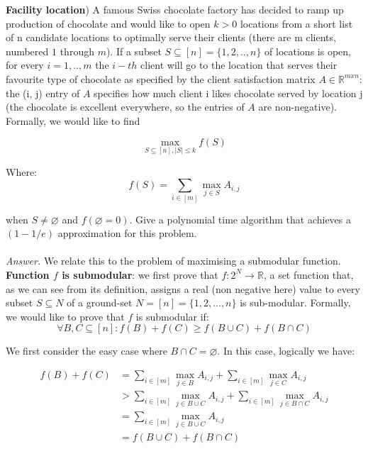 \documentclass[10pt,usenames,dvipsnames]{article}
\newenvironment{exercise}[2][Exercise]{\begin{trivlist}
  \item[\hskip \labelsep {\bfseries #1}\hskip \labelsep {\bfseries #2.}]}{\end{trivlist}}
\begin{document}
 \newpage
\begin{exercise}{4} (\textbf{Facility location}) A famous Swiss chocolate factory has decided to ramp up production of chocolate and would like to open $k>0$ locations from a short list of n candidate locations to optimally serve their clients (there are m clients, numbered $1$ through $m$).  If a
subset $ S \subseteq [n] = \{1,2,..,n\}$ of locations is open, for every $i = 1, ..,m$ the $i-th$ client will go to the location that serves their favourite type of chocolate as specified by the client satisfaction matrix $A \in \mathbb{R}^{mxn}$: the (i, j) entry of $A$ specifies how much client i likes chocolate served by
location j (the chocolate is excellent everywhere, so the entries of $A$ are non-negative). Formally,
we would like to find 

\begin{equation*}
    \max\limits_{S\subseteq[n], |S|\leq k} f(S) 
\end{equation*}

Where:
\begin{equation}
    f(S) = \sum_{i\in[m]}  \max\limits_{j\in S}A_{i,j}
\end{equation}

when $S \neq \varnothing$ and $f(\varnothing = 0)$. Give a polynomial time algorithm that achieves a $(1-1/e)$ approximation for this problem. 
\\ \\
\textit{Answer.} We relate this to the problem of maximising a submodular function. 
\newline \textbf{Function $f$ is submodular}:
we first prove that $f: 2^N \rightarrow \mathbb{R}$, a set function that, as we can see from its definition, assigns a real (non negative here) value to every subset $S \subseteq N$ of a ground-set $ N = [n] = \{1,2,...,n
\}$ is sub-modular. Formally, we would like to prove that $f$ is submodular if: 
\begin{equation}\label{eq:submodular}
    \forall B, C \subseteq [n]: f(B) + f(C) \geq f(B \cup C) + f(B \cap C)
\end{equation}

 We first consider the easy case where $B \cap C = \varnothing$. In this case, logically we have: 

\begin{align*}
    f(B) + f(C) &= \sum_{i\in[m]} \max\limits_{j\in B}A_{i,j} + \sum_{i\in[m]} \max\limits_{j\in C}A_{i,j} \\
     &>  \sum_{i\in[m]} \max\limits_{j\in B \cup C}A_{i,j} + \sum_{i\in[m]}  \max\limits_{j\in B \cap C}A_{i,j} \\
     &= \sum_{i\in[m]} \max\limits_{j\in B \cup C}A_{i,j} \\
     &= f(B \cup C) + f(B \cap C)
\end{align*}


\end{exercise}
\end{document}
